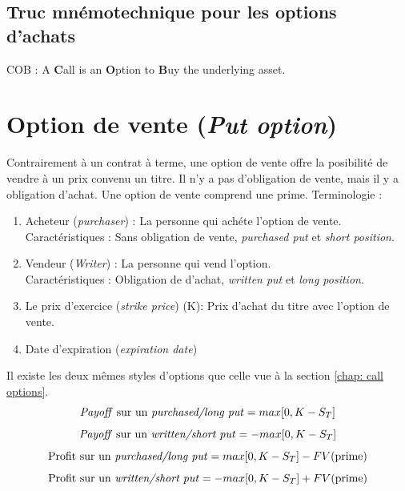 \documentclass[11pt,french]{report}
\begin{document}
\section{Truc mnémotechnique pour les options d'achats}
COB : A \textbf{C}all is an \textbf{O}ption to \textbf{B}uy the underlying asset.





\chapter{Option de vente (\emph{Put option})}
\label{chap:put option}


Contrairement à un contrat à terme, une option de vente offre la posibilité de vendre à un prix convenu un titre. Il n'y a pas d'obligation de vente, mais il y a obligation d'achat. Une option de vente comprend une prime.
Terminologie :
\begin{enumerate}
\item Acheteur (\emph{purchaser}) : La personne qui achéte l'option de vente. 
\\Caractéristiques : Sans obligation de vente, \emph{purchased put} et \emph{short position}.
\item Vendeur (\emph{Writer}) : La personne qui vend l'option.
\\Caractéristiques : Obligation de d'achat, \emph{written put} et \emph{long position}.
\item Le prix d'exercice (\emph{strike price}) (K): Prix d'achat du titre avec l'option de vente.
\item Date d'expiration (\emph{expiration date})
\end{enumerate}
Il existe les deux mêmes styles d'options que celle vue à la section \ref{chap: call options}.
\begin{equation}
\label{eq:chap:13:payoff long put}
\text{\emph{Payoff} sur un \emph{purchased/long put}} = max[0, K - S_T]
\end{equation}
\begin{equation}
\label{eq:chap:13:payoff short put}
\text{\emph{Payoff} sur un \emph{written/short put}} = - max[0, K - S_T]
\end{equation}
\begin{equation}
\text{Profit sur un \emph{purchased/long put}} = max[0, K - S_T] - FV(\text{prime})
\end{equation}
\begin{equation}
\text{Profit sur un \emph{written/short put}} = - max[0, K - S_T ] + FV(\text{prime})
\end{equation}
\end{document}
